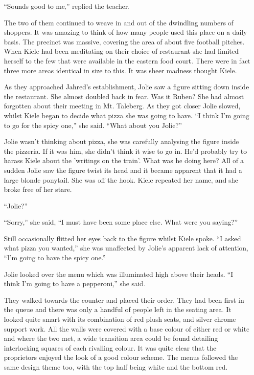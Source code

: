 ``Sounds good to me,'' replied the teacher.

The two of them continued to weave in and out of the dwindling numbers of shoppers.  It was amazing to think of how many people used this place on a daily basis.  The precinct was massive, covering the area of about five football pitches.  When Kiele had been meditating on their choice of restaurant she had limited herself to the few that were available in the eastern food court.  There were in fact three more areas identical in size to this.  It was sheer madness thought Kiele.

As they approached Jahred's establishment, Jolie saw a figure sitting down inside the restaurant.  She almost doubled back in fear.  Was it Ruben?  She had almost forgotten about their meeting in Mt. Taleberg.  As they got closer Jolie slowed, whilst Kiele began to decide what pizza she was going to have.  ``I think I'm going to go for the spicy one,'' she said.  ``What about you Jolie?''  

Jolie wasn't thinking about pizza, she was carefully analysing the figure inside the pizzeria.  If it was him, she didn't think it wise to go in.  He'd probably try to harass Kiele about the 'writings on the train'.  What was he doing here?  All of a sudden Jolie saw the figure twist its head and it became apparent that it had a large blonde ponytail.  She was off the hook.  Kiele repeated her name, and she broke free of her stare.

``Jolie?''

``Sorry,'' she said, ``I must have been some place else.  What were you saying?''

Still occasionally flitted her eyes back to the figure whilst Kiele spoke.  ``I asked what pizza you wanted,'' she was unaffected by Jolie's apparent lack of attention, ``I'm going to have the spicy one.''  

Jolie looked over the menu which was illuminated high above their heads.  ``I think I'm going to have a pepperoni,'' she said.  

They walked towards the counter and placed their order.  They had been first in the queue and there was only a handful of people left in the seating area.  It looked quite smart with its combination of red plush seats, and silver chrome support work.  All the walls were covered with a base colour of either red or white and where the two met, a wide transition area could be found detailing interlocking squares of each rivalling colour.  It was quite clear that the proprietors enjoyed the look of a good colour scheme.  The menus followed the same design theme too, with the top half being white and the bottom red.

